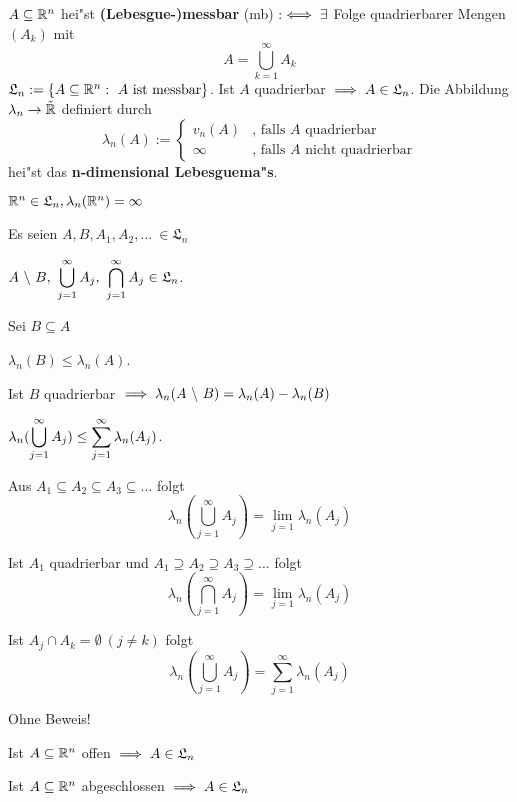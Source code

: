 \documentclass[a4paper,twoside,DIV15,BCOR12mm]{scrbook}
\begin{document}
\def\L{\mathfrak{L}}

\begin{definition}
$A\subseteq\mathbb{R}^n$ hei"st \textbf{(Lebesgue-)messbar} (mb) :$\iff\exists$ Folge quadrierbarer Mengen $(A_k)$ mit
\[
	A=\bigcup_{k=1}^\infty A_k
\]
$\L_n:=\{A\subseteq\MdR^n:\ A \text{ ist messbar}\}$. Ist $A$ quadrierbar $\folgt A\in\L_n$. Die Abbildung $\lambda_n\to\tilde{\mathbb{R}}$ definiert durch
\[
	\lambda_n(A):=\begin{cases}
		v_n(A) &\text{, falls } A \text{ quadrierbar}\\
		\infty &\text{, falls } A \text{ nicht quadrierbar}
	\end{cases}
\]
hei"st das \textbf{n-dimensional Lebesguema"s}.
\end{definition}

\begin{beispiel}
$\MdR^n\in\L_n, \lambda_n(\MdR^n)=\infty$
\end{beispiel}

\begin{satz}
Es seien $A, B, A_1, A_2, \ldots\ \in\L_n$
\begin{liste}
\item $A\ \backslash \ B,\ \ds\bigcup_{j=1}^\infty A_j,\ \ds\bigcap_{j=1}^\infty A_j\in\L_n$.
\item Sei $B\subseteq A$
\begin{liste}
\item $\lambda_n(B)\le\lambda_n(A)$.
\item Ist $B$ quadrierbar $\folgt\lambda_n(A\ \backslash\ B)=\lambda_n(A)-\lambda_n(B)$
\end{liste}
\item $\lambda_n(\displaystyle\bigcup_{j=1}^\infty A_j)\le\displaystyle\sum_{j=1}^\infty\lambda_n(A_j)$.
\item Aus $A_1\subseteq A_2\subseteq A_3\subseteq\ldots$ folgt
\[
\lambda_n(\bigcup_{j=1}^\infty A_j)=\lim_{j=1} \lambda_n(A_j)
\]
\item Ist $A_1$ quadrierbar und $A_1\supseteq A_2\supseteq A_3\supseteq\ldots$ folgt
\[
\lambda_n(\bigcap_{j=1}^\infty A_j)=\lim_{j=1} \lambda_n(A_j)
\]
\item Ist $A_j\cap A_k=\emptyset\ (j\ne k)$ folgt
\[
\lambda_n(\bigcup_{j=1}^\infty A_j)=\sum_{j=1}^\infty \lambda_n(A_j)
\]
\end{liste}
Ohne Beweis!
\end{satz}

\begin{folgerung}
\begin{liste}
\item Ist $A\subseteq\mathbb{R}^n$ offen $\folgt A\in\L_n$
\item Ist $A\subseteq\mathbb{R}^n$ abgeschlossen $\folgt A\in\L_n$
\end{liste}
\end{folgerung}
\end{document}
